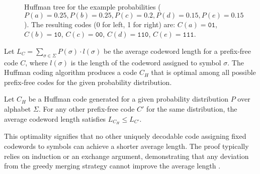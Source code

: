 \begin{example}
\begin{figure}[hbtp]
        \caption[Huffman tree example]{Huffman tree for the example probabilities ($P(a)= 0.25, P(b)=0.25, P(c)=0.2, P(d)=0.15, P(e)=0.15$). The resulting codes (0 for left, 1 for right) are: $C(a)=\texttt{01}$, $C(b)=\texttt{10}$, $C(c)=\texttt{00}$, $C(d)=\texttt{110}$, $C(e)=\texttt{111}$.}
        \label{fig:huffman_tree_example} %
    \end{figure}
\end{example}

Let $L_C = \sum_{\sigma \in \Sigma} P(\sigma) \cdot l(\sigma)$ be the average codeword length for a prefix-free code $C$, where $l(\sigma)$ is the length of the codeword assigned to symbol $\sigma$. The Huffman coding algorithm produces a code $C_H$ that is optimal among all possible prefix-free codes for the given probability distribution.

\begin{theorem} \label{thm:huffman_optimality}
    Let $C_H$ be a Huffman code generated for a given probability distribution $P$ over alphabet $\Sigma$. For any other prefix-free code $C'$ for the same distribution, the average codeword length satisfies $L_{C_H} \leq L_{C'}$.
\end{theorem}

This optimality signifies that no other uniquely decodable code assigning fixed codewords to symbols can achieve a shorter average length. The proof typically relies on induction or an exchange argument, demonstrating that any deviation from the greedy merging strategy cannot improve the average length \cite{ferragina2023pearls, sayood2002lossless, han2002mathematics, ElementsofInformationTheory}.


